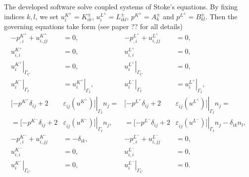 \documentclass[12pt,a4paper]{article}
\newcommand{\str}[3]{\varepsilon^{#1}_{#2} \left( #3 \right)}
\begin{document}
The developed software solve coupled systems of Stoke's equations. By fixing indices $k,l$, we set $u_i^{K^{\pm}} = K^{\pm}_{ik}$, $u_i^{L^{\pm}} = L^{\pm}_{ikl}$, $p^{K^{\pm}} = A^{\pm}_{k}$ and $p^{L^{\pm}} = B^{\pm}_{kl}$. Then the governing equations take form (see paper ?? for all details)
\begin{align}
- p^{K^{+}}_{,i} + u^{K^{+}}_{i,jj} & = 0, &  - p^{L^{+}}_{,i} + u^{L^{+}}_{i,jj} & = 0, \\
u^{K^{+}}_{i,i} & = 0, & u^{L^{+}}_{i,i} & = 0 , \\
\left. u^{K^{+}}_{i} \right|_{\Gamma_C} & = 0, & \left. u^{L^{+}}_{i} \right|_{\Gamma_C} & = 0, \\
\left. u^{K^{-}}_{i} \right|_{\Gamma_I} & = \left. u^{K^{+}}_{i} \right|_{\Gamma_I}, &  \left. u^{L^{-}}_{i} \right|_{\Gamma_I} & = \left. u^{L^{+}}_{i} \right|_{\Gamma_I},  \\
[ - p^{K^{+}} \delta_{ij} + 2 & \left. \str{}{ij}{u^{K^{+}}} ] \right|_{\Gamma_I} n_j = &  [ - p^{L^{+}} \delta_{ij} + 2 & \left. \str{}{ij}{u^{L^{+}}} ] \right|_{\Gamma_I} n_j = \\
= [ - p^{K^{-}} \delta_{ij} + 2 & \left. \str{}{ij}{u^{K^{-}}} ] \right|_{\Gamma_I} n_j,  &  = [ - p^{L^{-}} \delta_{ij} + 2 & \left. \str{}{ij}{u^{L^{-}}} ] \right|_{\Gamma_I} n_j - \delta_{ik} n_l,  \\
- p^{K^{-}}_{,i} + u^{K^{-}}_{i,jj} & = - \delta_{ik},  & - p^{L^{-}}_{,i} + u^{L^{-}}_{i,jj} & = 0,  \\
u^{K^{-}}_{i,i} & = 0, & u^{L^{-}}_{i,i} & = 0, \\
\left. u^{K^{-}}_{i} \right|_{\Gamma_C} & = 0, & \left. u^{L^{-}}_{i} \right|_{\Gamma_C} & = 0.
\end{align}
\end{document}
